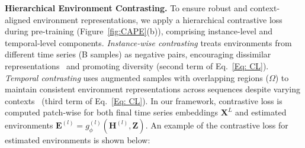 \noindent\textbf{Hierarchical Environment Contrasting.} 
To ensure robust and context-aligned environment representations, we apply a hierarchical contrastive loss during pre-training (Figure~\ref{fig:CAPE}(b)), comprising instance-level and temporal-level components. \textit{Instance-wise contrasting} treats environments from different time series (B samples) as negative pairs, encouraging dissimilar representations~\cite{yue2022ts2vec} and promoting diversity (second term of Eq.~\ref{Eq: CL}). \textit{Temporal contrasting} uses augmented samples with overlapping regions ($\Omega$) to maintain consistent environment representations across sequences despite varying contexts~\cite{yue2022ts2vec} (third term of Eq.~\ref{Eq: CL}). In our framework, contrastive loss is computed patch-wise for both final time series embeddings \( \mathbf{X}^{L} \) and estimated environments \( \mathbf{E}^{(l)} = g_{\phi}^{(l)}(\mathbf{H}^{(l)}, \mathbf{Z}) \). An example of the contrastive loss for estimated environments is shown below:


